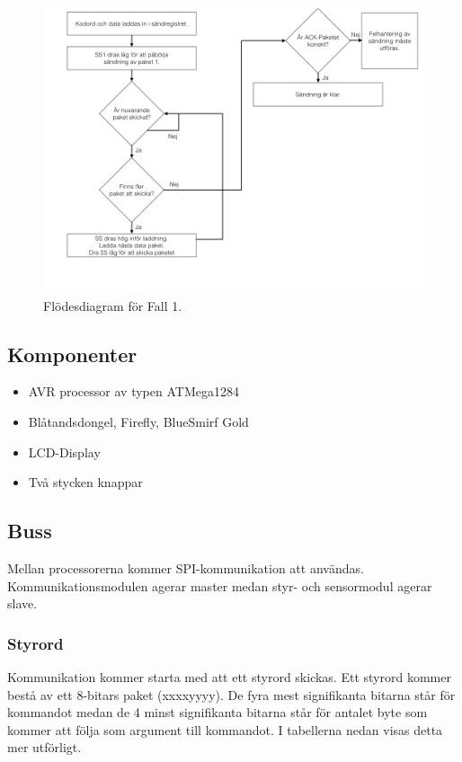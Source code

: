 \documentclass[a4paper,12pt,fleqn]{article}
\begin{document}
\begin{figure}[htp] %
  \begin{center}
  \includegraphics[keepaspectratio=true,scale=0.4]{SPIbild002.jpg}  %
  \end{center}
  \caption{Flödesdiagram för Fall 1.} %
  \label{fig:case4flow}
  
\end{figure}

\subsection{Komponenter}
\begin{itemize}
  \item AVR processor av typen ATMega1284
  \item Blåtandsdongel, Firefly, BlueSmirf Gold
  \item LCD-Display
  \item Två stycken knappar
\end{itemize}

\subsection{Buss}
Mellan processorerna kommer SPI-kommunikation att användas. Kommunikationsmodulen agerar master medan styr- och sensormodul agerar slave. 

\subsubsection{Styrord}
Kommunikation kommer starta med att ett styrord skickas. Ett styrord kommer bestå av ett 8-bitars paket (xxxxyyyy). De fyra mest signifikanta bitarna står för kommandot medan de 4 minst signifikanta bitarna står för antalet byte som kommer att följa som argument till kommandot. I tabellerna nedan visas detta mer utförligt. \\
\end{document}
